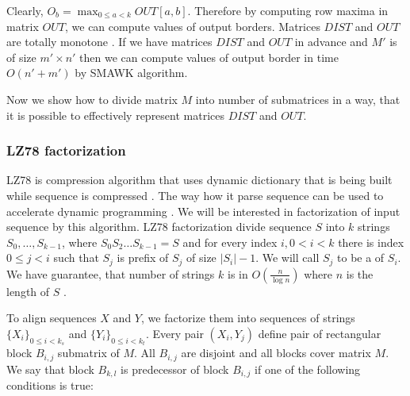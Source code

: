 Clearly, $O_b=\max_{0\leq a < k}OUT[a,b]$. Therefore by computing row maxima in
matrix $OUT$, we can compute values of output borders. Matrices $DIST$ and $OUT$
are totally monotone \cite{Crochemore2002}.  If we have matrices $DIST$ and
$OUT$ in advance and $M'$ is of size $m'\times n'$ then we can compute values of
output border in time $O(n'+m')$ by SMAWK algorithm.

Now we show how to divide matrix $M$ into number of submatrices in a way, that
it is possible to effectively represent matrices $DIST$ and $OUT$.


\subsubsection{LZ78 factorization}

LZ78 is compression algorithm that uses dynamic dictionary that is being built
while sequence is compressed \cite{Lempel1976}. The way how it parse sequence
can be used to accelerate dynamic programming \cite{Crochemore2002,Weimann2009}. We will be interested in
factorization of input sequence by this algorithm. LZ78 factorization divide
sequence $S$ into $k$ strings $S_0,\dots,S_{k-1}$, where $S_0S_2\dots S_{k-1}=S$ and
for every index  $i,0< i <k$ there is index $0\leq j<i$ such that $S_j$ is
prefix of $S_j$ of size $|S_i|-1$. We will call $S_j$ to be a
 of $S_i$.  We have guarantee, that number of strings
$k$ is in  $O(\frac{n}{\log n})$ where $n$ is the length of $S$
\cite{Lempel1976}. 

To align sequences $X$ and $Y$, we factorize them into sequences of strings
$\{X_i\}_{0\leq i < k_s}$ and $\{Y_i\}_{0\leq i<k_t}$.  Every pair $(X_i,Y_j)$
define pair of rectangular block $B_{i,j}$ submatrix of $M$.  All $B_{i,j}$ are
disjoint and all blocks cover matrix $M$. We say that block $B_{k,l}$ is
predecessor of block $B_{i,j}$ if one of the following conditions is true:


